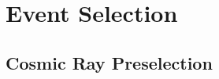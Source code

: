 \chapter{Event Selection}
\label{event_selection_chapter}


\section{Cosmic Ray Preselection}
\label{cosmicveto_section}

